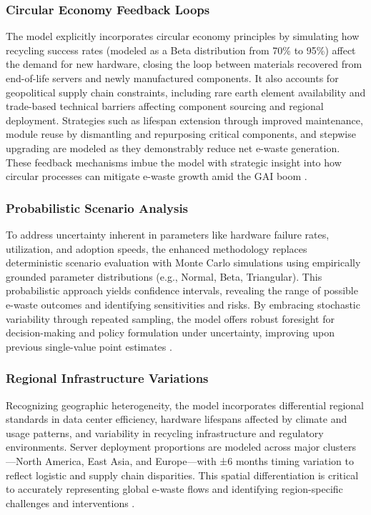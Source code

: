\documentclass[a4paper, 12pt]{article}
\begin{document}
\subsubsection{Circular Economy Feedback Loops}
The model explicitly incorporates circular economy principles by simulating how recycling success rates (modeled as a Beta distribution from 70\% to 95\%) affect the demand for new hardware, closing the loop between materials recovered from end-of-life servers and newly manufactured components. It also accounts for geopolitical supply chain constraints, including rare earth element availability and trade-based technical barriers affecting component sourcing and regional deployment. Strategies such as lifespan extension through improved maintenance, module reuse by dismantling and repurposing critical components, and stepwise upgrading are modeled as they demonstrably reduce net e-waste generation. These feedback mechanisms imbue the model with strategic insight into how circular processes can mitigate e-waste growth amid the GAI boom \citep{wang_2024_ewaste}.

\subsubsection{Probabilistic Scenario Analysis}
To address uncertainty inherent in parameters like hardware failure rates, utilization, and adoption speeds, the enhanced methodology replaces deterministic scenario evaluation with Monte Carlo simulations using empirically grounded parameter distributions (e.g., Normal, Beta, Triangular). This probabilistic approach yields confidence intervals, revealing the range of possible e-waste outcomes and identifying sensitivities and risks. By embracing stochastic variability through repeated sampling, the model offers robust foresight for decision-making and policy formulation under uncertainty, improving upon previous single-value point estimates \citep{wang_2024_ewaste}.

\subsubsection{Regional Infrastructure Variations}
Recognizing geographic heterogeneity, the model incorporates differential regional standards in data center efficiency, hardware lifespans affected by climate and usage patterns, and variability in recycling infrastructure and regulatory environments. Server deployment proportions are modeled across major clusters—North America, East Asia, and Europe—with ±6 months timing variation to reflect logistic and supply chain disparities. This spatial differentiation is critical to accurately representing global e-waste flows and identifying region-specific challenges and interventions \citep{wang_2024_ewaste}.
\end{document}
